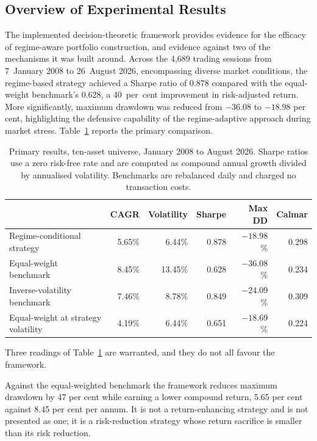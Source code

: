 \documentclass{singlecol-new}
\theoremstyle{TH}{
\newtheorem{lemma}{Lemma}
\newtheorem{theorem}[lemma]{Theorem}
\newtheorem{corrolary}[lemma]{Corrolary}
\newtheorem{conjecture}[lemma]{Conjecture}
\newtheorem{proposition}[lemma]{Proposition}
\newtheorem{claim}[lemma]{Claim}
\newtheorem{stheorem}[lemma]{Wrong Theorem}
\newtheorem{algorithm}{Algorithm}
}
\theoremstyle{THrm}{
\newtheorem{definition}{Definition}[section]
\newtheorem{question}{Question}[section]
\newtheorem{remark}{Remark}
\newtheorem{scheme}{Scheme}
}
\theoremstyle{THhit}{
\newtheorem{case}{Case}[section]
}
\begin{document}
\subsection{Overview of Experimental Results}

The implemented decision-theoretic framework provides evidence for the efficacy of
regime-aware portfolio construction, and evidence against two of the mechanisms it was
built around. Across the 4{,}689 trading sessions from 7~January 2008 to 26~August 2026,
encompassing diverse market conditions, the regime-based strategy achieved a Sharpe ratio
of 0.878 compared with the equal-weight benchmark's 0.628, a 40~per~cent improvement in
risk-adjusted return. More significantly, maximum drawdown was reduced from $-36.08$ to
$-18.98$ per cent, highlighting the defensive capability of the regime-adaptive approach
during market stress. Table~\ref{tab:main} reports the primary comparison.

\begin{table}[!ht]
\centering
\caption{Primary results, ten-asset universe, January 2008 to August 2026. Sharpe
ratios use a zero risk-free rate and are computed as compound annual growth divided by
annualised volatility. Benchmarks are rebalanced daily and charged no transaction costs.}
\label{tab:main}
\footnotesize
\begin{tabular}{p{4.4cm}rrrrr}
\hline
& \textbf{CAGR} & \textbf{Volatility} & \textbf{Sharpe} & \textbf{Max DD} & \textbf{Calmar} \\
\hline
Regime-conditional strategy & 5.65\% & 6.44\% & 0.878 & $-18.98$\% & 0.298 \\
Equal-weight benchmark & 8.45\% & 13.45\% & 0.628 & $-36.08$\% & 0.234 \\
Inverse-volatility benchmark & 7.46\% & 8.78\% & 0.849 & $-24.09$\% & 0.309 \\
Equal-weight at strategy volatility & 4.19\% & 6.44\% & 0.651 & $-18.69$\% & 0.224 \\
\hline
\end{tabular}
\end{table}

Three readings of Table~\ref{tab:main} are warranted, and they do not all favour the
framework.

Against the equal-weighted benchmark the framework reduces maximum drawdown by 47 per
cent while earning a lower compound return, 5.65 per cent against 8.45 per cent per
annum. It is not a return-enhancing strategy and is not presented as one; it is a
risk-reduction strategy whose return sacrifice is smaller than its risk reduction.
\end{document}
